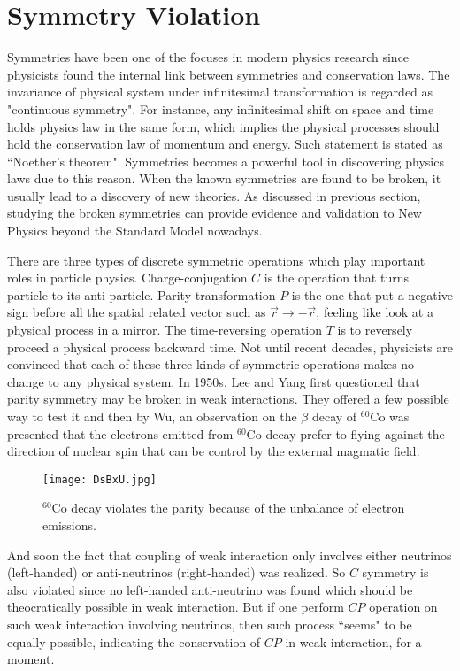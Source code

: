 \section{Symmetry Violation}
Symmetries have been one of the focuses in modern physics research since physicists found the internal link between symmetries and conservation laws. The invariance of physical system under infinitesimal transformation is regarded as "continuous symmetry". For instance, any infinitesimal shift on space and time holds physics law in the same form, which implies the physical processes should hold the conservation law of momentum and energy. Such statement is stated as ``Noether’s theorem"\cite{noether}.  Symmetries becomes a powerful tool in discovering physics laws due to this reason. When the known symmetries are found to be broken, it usually lead to a discovery of new theories. As discussed in previous section, studying the broken symmetries can provide evidence and validation to New Physics beyond the Standard Model nowadays.


There are three types of discrete symmetric operations which play important roles in particle physics. Charge-conjugation $\textit{C}$ is the operation that turns particle to its anti-particle. Parity transformation $\textit{P}$  is the one that put a negative sign before all the spatial related vector such as $\overrightarrow{r} \to -\overrightarrow{r}$, feeling like look at a physical process in a mirror. The time-reversing operation $\textit{T}$ is to reversely proceed a physical process backward time. Not until recent decades, physicists are convinced that each of these three kinds of symmetric operations makes no change to any physical system. In 1950s, Lee and Yang \cite{PhysRev.104.254} first questioned that parity symmetry may be broken in weak interactions. They offered a few possible way to test it and then by Wu, an observation on the $\beta$ decay of $^{60}$Co was presented that the electrons emitted from  $^{60}$Co decay prefer to flying against the direction of nuclear spin that can be control by the external magmatic field. 

\begin{figure}[htbp]
	\centering
	\texttt{[image: DsBxU.jpg]}
	\caption{$^{60}$Co decay violates the parity because of the unbalance of electron emissions.}
\end{figure}

And soon the fact that coupling of weak interaction only involves either neutrinos (left-handed) or anti-neutrinos (right-handed) was realized. So $C$ symmetry is also violated since no left-handed anti-neutrino was found which should be theocratically possible in weak interaction. But if one perform $CP$ operation on such weak interaction involving neutrinos, then such process ``seems" to be equally possible, indicating the conservation of $CP$ in weak interaction, for a moment. 

